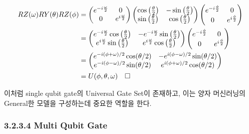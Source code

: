 \begin{align*}
    RZ(\omega)RY(\theta)RZ(\phi) &= \begin{pmatrix} e^{-i{\omega \over 2}} & 0 \\ 0 & e^{i{\omega \over 2}} \end{pmatrix} \begin{pmatrix} \cos\left({\theta \over 2}\right) & -\sin\left({\theta \over 2}\right) \\ \sin\left({\theta \over 2}\right) & \cos\left({\theta \over 2}\right) \end{pmatrix} \begin{pmatrix} e^{-i{\phi \over 2}} & 0 \\ 0 & e^{i{\phi \over 2}} \end{pmatrix} \\
    &= \begin{pmatrix} e^{-i{\omega \over 2}}\cos\left({\theta \over 2}\right) & -e^{-i{\omega \over 2}}\sin\left({\theta \over 2}\right) \\ e^{i{\omega \over 2}}\sin\left({\theta \over 2}\right) & e^{i{\omega \over 2}}\cos\left({\theta \over 2}\right) \end{pmatrix} \begin{pmatrix} e^{-i{\phi \over 2}} & 0 \\ 0 & e^{i{\phi \over 2}} \end{pmatrix} \\
    &= \begin{pmatrix}
     e^{-i(\phi + \omega)/2}\cos(\theta/2) & {-e^{i(\phi - \omega)/2}\sin(\theta/2) } \\
     e^{-i(\phi - \omega)/2}\sin(\theta/2) & {e^{i(\phi + \omega)/2}\cos(\theta/2) }
    \end{pmatrix} \\
    &= U(\phi, \theta, \omega) \quad \square
\end{align*}

이처럼 single qubit gate의 Universal Gate Set이 존재하고, 이는 양자 머신러닝의 General한 모델을 구성하는데 중요한 역할을 한다.



\subsubsection{3.2.3.4 \quad Multi Qubit Gate}

